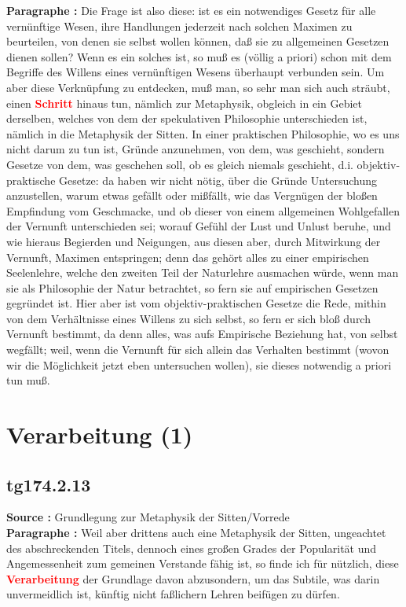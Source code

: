 \documentclass[a4paper,12pt,twoside]{book}
\newcommand{\match}[1]{\textcolor{red}{\textbf{#1}}}
\newcommand{\unnumberedsection}[1]{
	\section*{#1}
	\addcontentsline{toc}{section}{#1}
	\markright{#1}
}
\begin{document}
	\noindent\textbf{Paragraphe : }Die Frage ist also diese: ist es ein notwendiges Gesetz für alle vernünftige Wesen, ihre Handlungen jederzeit nach solchen Maximen zu beurteilen, von denen sie selbst wollen können, daß sie zu allgemeinen Gesetzen dienen sollen? Wenn es ein solches ist, so muß es (völlig a priori) schon mit dem Begriffe des Willens eines vernünftigen Wesens überhaupt verbunden sein. Um aber diese Verknüpfung zu entdecken, muß man, so sehr man sich auch sträubt, einen \match{Schritt} hinaus tun, nämlich zur Metaphysik, obgleich in ein Gebiet derselben, welches von dem der spekulativen Philosophie unterschieden ist, nämlich in die Metaphysik der Sitten. In einer praktischen Philosophie, wo es uns nicht darum zu tun ist, Gründe anzunehmen, von dem, was geschieht, sondern Gesetze von dem, was geschehen soll, ob es gleich niemals geschieht, d.i. objektiv-praktische Gesetze: da haben wir nicht nötig, über die Gründe Untersuchung anzustellen, warum etwas gefällt oder mißfällt, wie das Vergnügen der bloßen Empfindung vom Geschmacke, und ob dieser von einem allgemeinen Wohlgefallen der Vernunft unterschieden sei; worauf Gefühl der Lust und Unlust beruhe, und wie hieraus Begierden und Neigungen, aus diesen aber, durch Mitwirkung der Vernunft, Maximen entspringen; denn das gehört alles zu einer empirischen Seelenlehre, welche den zweiten Teil der Naturlehre ausmachen würde, wenn man sie als Philosophie der Natur betrachtet, so fern sie auf empirischen Gesetzen gegründet ist. Hier aber ist vom objektiv-praktischen Gesetze die Rede, mithin von dem Verhältnisse eines Willens zu sich selbst, so fern er sich bloß durch Vernunft bestimmt, da denn alles, was aufs  Empirische Beziehung hat, von selbst wegfällt; weil, wenn die Vernunft für sich allein das Verhalten bestimmt (wovon wir die Möglichkeit jetzt eben untersuchen wollen), sie dieses notwendig a priori tun muß. 
	
	\unnumberedsection{Verarbeitung (1)} 
	\subsection*{tg174.2.13} 
	\textbf{Source : }Grundlegung zur Metaphysik der Sitten/Vorrede\\  
	
	\noindent\textbf{Paragraphe : }Weil aber drittens auch eine Metaphysik der Sitten, ungeachtet des abschreckenden Titels, dennoch eines großen Grades der Popularität und Angemessenheit zum gemeinen Verstande fähig ist, so finde ich für nützlich, diese \match{Verarbeitung} der Grundlage davon abzusondern, um das Subtile, was darin unvermeidlich ist, künftig nicht faßlichern Lehren beifügen zu dürfen. 
	
\end{document}
